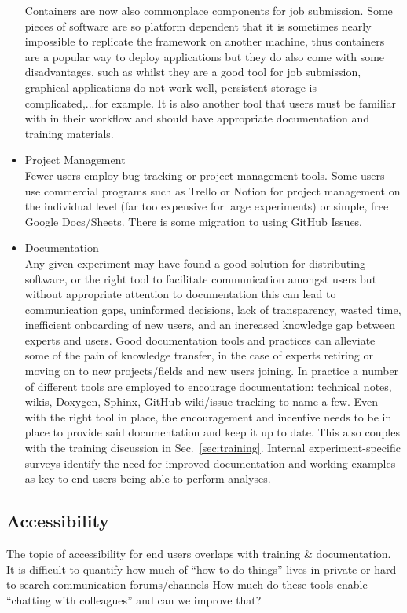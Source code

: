 \begin{itemize}
Containers are now also commonplace components for job submission. Some pieces of software are so platform dependent that it is sometimes nearly impossible to replicate the framework on another machine, thus containers are a popular way to deploy applications but they do also come with some disadvantages, such as whilst they are a good tool for job submission, graphical applications do not work well, persistent storage is complicated,...for example. It is also another tool that users must be familiar with in their workflow and should have appropriate documentation and training materials.
  \item Project Management\\
Fewer users employ bug-tracking or project management tools. Some users use commercial programs such as Trello or Notion for project management on the individual level (far too expensive for large experiments) or simple, free Google Docs/Sheets. There is some migration to using GitHub Issues.
  \item Documentation\\
Any given experiment may have found a good solution for distributing software, or the right tool to facilitate communication amongst users but without appropriate attention to documentation this can lead to communication gaps, uninformed decisions, lack of transparency, wasted time, inefficient onboarding of new users, and an increased knowledge gap between experts and users.  Good documentation tools and practices can alleviate some of the pain of knowledge transfer, in the case of experts retiring or moving on to new projects/fields and new users joining. In practice a number of different tools are employed to encourage documentation: technical notes, wikis, Doxygen, Sphinx, GitHub wiki/issue tracking to name a few. Even with the right tool in place, the encouragement and incentive needs to be in place to provide said documentation and keep it up to date. This also couples with the training discussion in Sec.~\ref{sec:training}. Internal experiment-specific surveys identify the need for improved documentation and working examples as key to end users being able to perform analyses.

\end{itemize}

\subsection{Accessibility}
The topic of accessibility for end users overlaps with training \& documentation. It is difficult to quantify how much of “how to do things” lives in private or hard-to-search communication forums/channels
How much do these tools enable “chatting with colleagues” and can we improve that?


